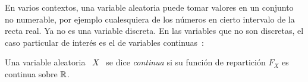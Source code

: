
\label{Ssec:MP:VAContinua}

En varios contextos,  una variable aleatoria puede tomar  valores en un conjunto
no numerable, por  ejemplo cualesquiera de los n\'umeros  en cierto intervalo de
la recta  real. Ya  no es  una variable discreta.  En las  variables que  no son
discretas,   el   caso   particular    de   inter\'es   es   el   de   variables
continuas~\cite{AthLah06, HogMck13}:
%
\begin{definicion}
\label{Def:MP:VariableAleatoriaContinua}
%
  Una variable  aleatoria \  $X$ \ se  dice {\it  continua} si su  funci\'on de
  repartici\'on  $F_X$ es  continua sobre  $\mathbb{R}$.
\end{definicion}

